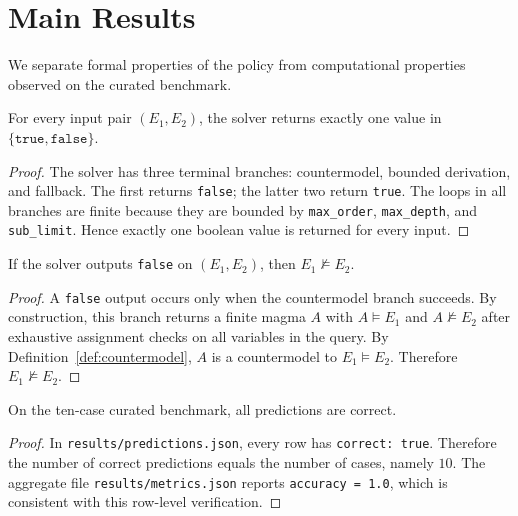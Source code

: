 \section{Main Results}

We separate formal properties of the policy from computational properties observed on the curated benchmark.

\begin{proposition}\label{prop:boolean}
For every input pair $(E_1,E_2)$, the solver returns exactly one value in $\{\texttt{true},\texttt{false}\}$.
\end{proposition}

\begin{proof}
The solver has three terminal branches: countermodel, bounded derivation, and fallback. The first returns \texttt{false}; the latter two return \texttt{true}. The loops in all branches are finite because they are bounded by \texttt{max\_order}, \texttt{max\_depth}, and \texttt{sub\_limit}. Hence exactly one boolean value is returned for every input.
\end{proof}

\begin{theorem}\label{thm:sound-negative}
If the solver outputs \texttt{false} on $(E_1,E_2)$, then $E_1\not\models E_2$.
\end{theorem}

\begin{proof}
A \texttt{false} output occurs only when the countermodel branch succeeds. By construction, this branch returns a finite magma $A$ with $A\models E_1$ and $A\not\models E_2$ after exhaustive assignment checks on all variables in the query. By Definition~\ref{def:countermodel}, $A$ is a countermodel to $E_1\models E_2$. Therefore $E_1\not\models E_2$.
\end{proof}

\begin{proposition}\label{prop:bench-correct}
On the ten-case curated benchmark, all predictions are correct.
\end{proposition}

\begin{proof}
In \texttt{results/predictions.json}, every row has \texttt{correct: true}. Therefore the number of correct predictions equals the number of cases, namely $10$. The aggregate file \texttt{results/metrics.json} reports \texttt{accuracy = 1.0}, which is consistent with this row-level verification.
\end{proof}

